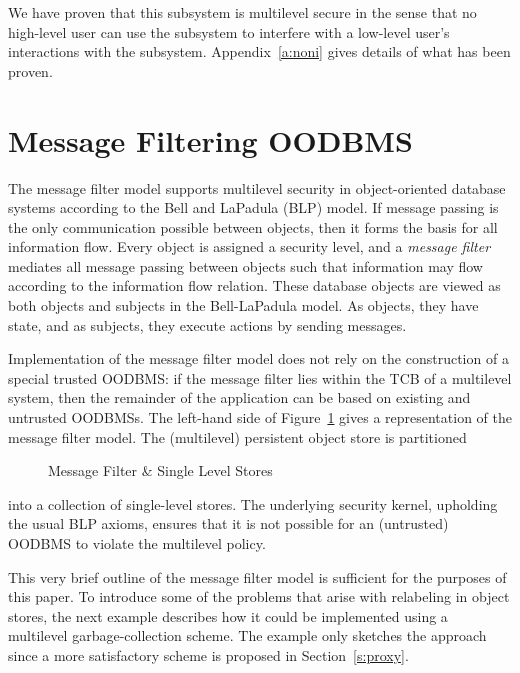 We have proven that this subsystem is multilevel secure in the sense
that no high-level user can use the subsystem to interfere with a
low-level user's interactions with the subsystem. Appendix~\ref{a:noni}
gives details of what has been proven. 

\section{Message Filtering OODBMS} \label{s:mf}


The message filter model \cite{jajodia:mf:90} supports multilevel
security in object-oriented database systems according to the Bell and
LaPadula (BLP) model.  If message passing is the only communication possible
between objects, then it forms the basis for all information flow.  Every
object is assigned a security level, and a {\it message filter\/}
mediates all message passing between objects 
 such that information may flow  according to the information flow relation.
These database objects are viewed as both objects and subjects in the
Bell-LaPadula model.  As objects, they have state, and as subjects,
they execute actions by sending messages. 

Implementation of the  message filter model does not rely on the
construction of a special trusted OODBMS:  if the   message filter
lies within the TCB of a multilevel system, then the remainder of the
application can be based on existing and untrusted OODBMSs.
The left-hand side of Figure~\ref{f:mf}
gives a representation of the message filter model.
The (multilevel) persistent object store is partitioned
\begin{figure}[htb]
\begin{center}

\end{center}
\caption{Message Filter \& Single Level Stores \label{f:mf}}
\end{figure}
into a collection of single-level stores. The underlying security
kernel, upholding the usual BLP axioms, ensures that it is not possible
for an (untrusted) OODBMS to violate the multilevel policy. 

This very brief outline of the message filter model is sufficient for
the purposes of this paper.  To introduce some of the problems that
arise with relabeling in object stores, the next example describes how
it could be implemented using a multilevel garbage-collection scheme.
The example only sketches the approach since a more satisfactory scheme
is proposed in Section~\ref{s:proxy}.



